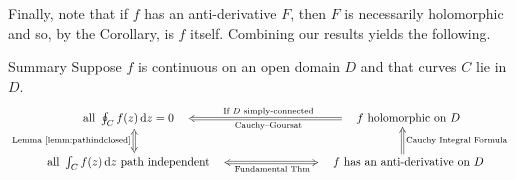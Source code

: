 Finally, note that if $f$ has an anti-derivative $F$, then $F$ is necessarily holomorphic and so, by the Corollary, is $f$ itself. Combining our results yields the following.\smallbreak

\begin{thm*}{Summary}
Suppose $f$ is continuous on an open domain $D$ and that curves $C$ lie in $D$.
\[\xymatrix @R20pt @C80pt{
\text{all}\ \oint_C f(z)\,\dz=0\quad \ar@{<=>}[d]_{\text{Lemma \ref*{lemm:pathindclosed}}}  & \quad f\ \text{holomorphic on $D$} \ar@{=>}[l]_{\text{If $D$ simply-connected}}^{\text{Cauchy--Goursat}}\\
\text{all}\ \int_C f(z)\,\dz\ \text{path independent} \quad \ar@{<=>}[r]_{\ \ \text{Fundamental Thm}} & \quad f\ \text{has an anti-derivative on $D$} \ar@{=>}[u]_{\text{Cauchy Integral Formula}} 
}\]
\end{thm*}




 





